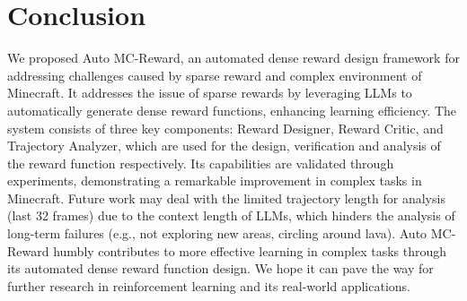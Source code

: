 \vspace{-1mm}
\section{Conclusion}
\label{sec:conclusion}
\vspace{-2mm}

We proposed Auto MC-Reward, an automated dense reward design framework for addressing challenges caused by sparse reward and complex environment of Minecraft. It addresses the issue of sparse rewards by leveraging LLMs to automatically generate dense reward functions, enhancing learning efficiency. The system consists of three key components: Reward Designer, Reward Critic, and Trajectory Analyzer, which are used for the design, verification and analysis of the reward function respectively. Its capabilities are validated through experiments, demonstrating a remarkable improvement in complex tasks in Minecraft. Future work may deal with the limited trajectory length for analysis (last 32 frames) due to the context length of LLMs, which hinders the analysis of long-term failures (e.g., not exploring new areas, circling around lava). Auto MC-Reward humbly contributes to more effective learning in complex tasks through its automated dense reward function design.
We hope it can pave the way for further research in reinforcement learning and its real-world applications.

